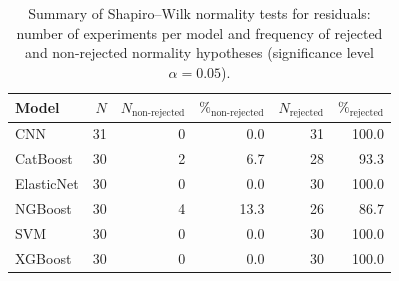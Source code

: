 \begin{table}
\centering
\caption{Summary of Shapiro--Wilk normality tests for residuals: number of experiments per model and frequency of rejected and non-rejected normality hypotheses (significance level $\alpha = 0.05$).}
\label{tab:residual_normality_summary}
\begin{tabular}{lrrrrr}
\toprule
     Model &  $N$ &  $N_{\mathrm{non\text{-}rejected}}$ & $\%_{\mathrm{non\text{-}rejected}}$ &  $N_{\mathrm{rejected}}$ & $\%_{\mathrm{rejected}}$ \\
\midrule
       CNN &   31 &                                   0 &                                 0.0 &                       31 &                    100.0 \\
  CatBoost &   30 &                                   2 &                                 6.7 &                       28 &                     93.3 \\
ElasticNet &   30 &                                   0 &                                 0.0 &                       30 &                    100.0 \\
   NGBoost &   30 &                                   4 &                                13.3 &                       26 &                     86.7 \\
       SVM &   30 &                                   0 &                                 0.0 &                       30 &                    100.0 \\
   XGBoost &   30 &                                   0 &                                 0.0 &                       30 &                    100.0 \\
\bottomrule
\end{tabular}
\end{table}
